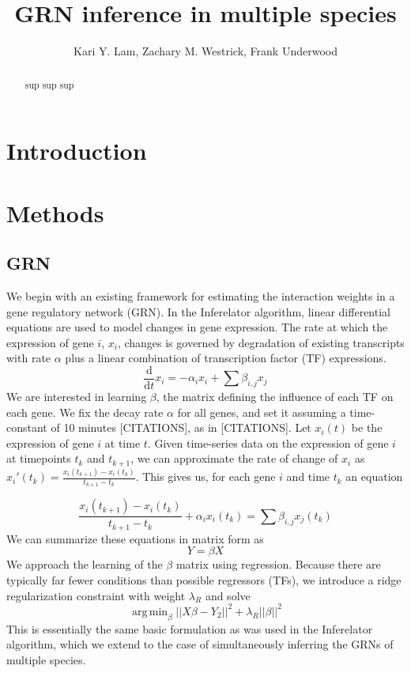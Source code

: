 \documentclass[11pt]{article}
\DeclareMathOperator*{\argmin}{arg\,min}
\begin{document}
\title{GRN inference in multiple species}
\author{Kari Y. Lam, Zachary M. Westrick, Frank Underwood}
\maketitle

\begin{abstract}
sup sup sup
\end{abstract}

\section{Introduction}

\section{Methods}
\subsection{GRN}
We begin with an existing framework for estimating the interaction weights in a gene regulatory network (GRN). In the Inferelator algorithm, linear differential equations are used to model changes in gene expression. The rate at which the expression of gene $i$, $x_i$, changes is governed by degradation of existing transcripts with rate $\alpha$ plus a linear combination of transcription factor (TF) expressions.
\begin{equation}
\frac{\mathrm d}{\mathrm d t} x_i = -\alpha_{i}x_{i} + \sum \beta_{i,j}x_{j}
\end{equation}
We are interested in learning $\beta$, the matrix defining the influence of each TF on each gene. We fix the decay rate $\alpha$ for all genes, and set it assuming a time-constant of 10 minutes [CITATIONS], as in [CITATIONS]. Let $x_i(t)$ be the expression of gene $i$ at time $t$. Given time-series data on the expression of gene $i$ at timepoints $t_k$ and $t_{k+1}$, we can approximate the rate of change of $x_i$ as $x_i'(t_k)=\frac{x_i(t_{k+1})-x_i(t_k)}{t_{k+1}-t_k}$. This gives us, for each gene $i$ and time $t_{k}$ an equation

\begin{equation}
\frac{x_i(t_{k+1})-x_i(t_k)}{t_{k+1}-t_k} + \alpha_{i}x_{i}(t_k)= \sum \beta_{i,j}x_{j}(t_k)
\end{equation}
\noindent We can summarize these equations in matrix form as
\begin{equation}
Y = \beta X
\end{equation}
\noindent We approach the learning of the $\beta$ matrix using regression. Because there are typically far fewer conditions than possible regressors (TFs), we introduce a ridge regularization constraint with weight $\lambda_R$ and solve
\begin{equation}
\argmin_\beta\vert \vert X\beta - Y_2 \vert \vert ^2 + \lambda_R \vert \vert \beta \vert \vert ^2
\end{equation}
This is essentially the same basic formulation as was used in the Inferelator algorithm, which we extend to the case of simultaneously inferring the GRNs of multiple species. 
\end{document}
